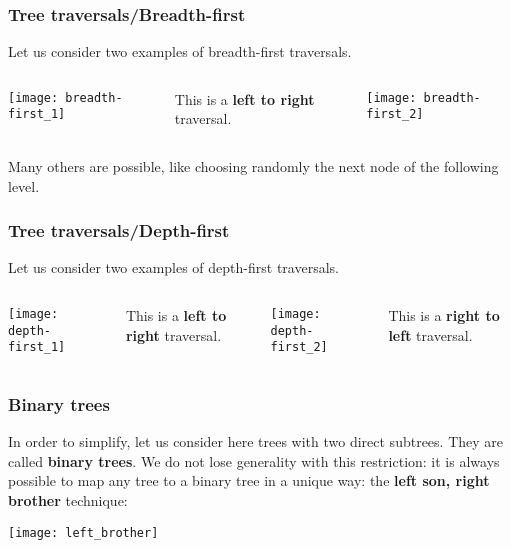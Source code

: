 %
\begin{frame}
\frametitle{Tree traversals/Breadth-first}

\label{breadth_first_pictures}

Let us consider two examples of breadth-first traversals.

\bigskip

\begin{columns}
    \begin{center}
      \texttt{[image: breadth-first\_1]}
    \end{center}
    This is a \textbf{left to right} traversal.
    \begin{center}
      \texttt{[image: breadth-first\_2]}
    \end{center}
\end{columns}

\bigskip

Many others are possible, like choosing randomly the next node of the
following level.

\end{frame}

%
\begin{frame}
\frametitle{Tree traversals/Depth-first}

Let us consider two examples of depth-first traversals.

\bigskip

\begin{columns}
    \begin{center}
      \texttt{[image: depth-first\_1]}
    \end{center}
    This is a \textbf{left to right} traversal.
    \begin{center}
      \texttt{[image: depth-first\_2]}
    \end{center}
    This is a \textbf{right to left} traversal.
\end{columns}

\end{frame}

%
\begin{frame}
\frametitle{Binary trees}

In order to simplify, let us consider here trees with two direct
subtrees. They are called \textbf{binary trees}. We do not lose
generality with this restriction: it is always possible to map any
tree to a binary tree in a unique way: the \textbf{left son, right
brother} technique:
\begin{center}
\texttt{[image: left\_brother]}
\end{center}

\end{frame}

